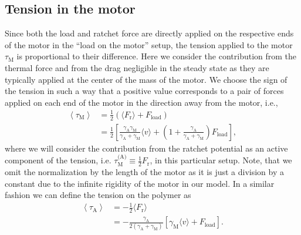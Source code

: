 \documentclass[aps,pre,twocolumn,showpacs,showkeys,superscriptaddress,floatfix]{revtex4-1}
\begin{document}
\subsection{Tension in the motor}
\label{sec:tension_motor}
Since both the load and ratchet force are directly applied on the respective ends of the motor in the ``load on the motor'' setup, 
the tension applied to the motor $\tau_\text{M}$ is proportional to their difference.
Here we consider the contribution from the thermal force and from the drag negligible in the steady state as they are typically applied at the center of the mass of the motor. 
We choose the sign of the tension in such a way 
that a positive value corresponds to a pair of forces applied on each end of the motor in the direction away from the motor,
i.e.,  
\begin{align}
\left\langle \tau_\text{M} \right\rangle 
&= \frac{1}{2} \left( \langle F_\text{r} \rangle + F_\text{load} \right) \nonumber \\
&= \frac{1}{2} \left[ \frac{\gamma_\text{A}\gamma_\text{M}}{\gamma_\text{A}+\gamma_\text{M}}\langle v\rangle 
+ \left(1 + \frac{\gamma_\text{A}}{\gamma_\text{A}+\gamma_\text{M}} \right) F_\text{load} \right],
\label{eq:tension}
\end{align}
where we will consider the contribution from the ratchet potential as an active component of the tension, i.e. $\tau_\text{M}^\text{(A)} \equiv \frac{1}{2} F_\text{r}$, in this particular setup. 
Note, that we omit the normalization by the length of the motor as it is just a division by a constant due to the infinite rigidity of the motor in our model.   
In a similar fashion we can define the tension on the polymer as
\begin{align}
\left\langle \tau_\text{A} \right\rangle 
&= - \frac{1}{2} \langle F_\text{r} \rangle \nonumber \\
&= - \frac{\gamma_\text{A}}{2 \left( \gamma_\text{A}+\gamma_\text{M} \right)} \left[ \gamma_\text{M} \langle v\rangle + F_\text{load} \right].
\label{eq:tension_on_polymer}
\end{align}
\end{document}
